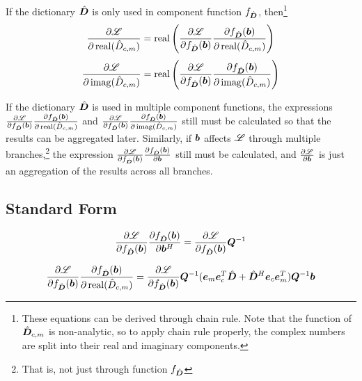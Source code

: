 \begin{appendices}
If the dictionary $\hat{\bm{D}}$ is only used in component function $f_{\hat{\bm{D}}}$, then\footnote{These equations can be derived through chain rule. Note that the function of $\hat{\bm{D}}_{c,m}$ is non-analytic, so to apply chain rule properly, the complex numbers are split into their real and imaginary components.}
\begin{equation}
\frac{\partial \mathscr{L}}{\partial \operatorname{real}(\hat{D}_{c,m})} = \operatorname{real}\left(\frac{\partial \mathscr{L}}{\partial f_{\hat{\bm{D}}}(\bm{b})}\frac{\partial f_{\hat{\bm{D}}}(\bm{b})}{\partial \operatorname{real}(\hat{D}_{c,m})}\right)
\end{equation}
\begin{equation}
\frac{\partial \mathscr{L}}{\partial \operatorname{imag}(\hat{D}_{c,m})} = \operatorname{real}\left(\frac{\partial \mathscr{L}}{\partial f_{\hat{\bm{D}}}(\bm{b})}\frac{\partial f_{\hat{\bm{D}}}(\bm{b})}{\partial \operatorname{imag}(\hat{D}_{c,m})}\right)
\end{equation}

If the dictionary $\hat{\bm{D}}$ is used in multiple component functions, the expressions $\frac{\partial \mathscr{L}}{\partial f_{\hat{\bm{D}}}(\bm{b})}\frac{\partial f_{\hat{\bm{D}}}(\bm{b})}{\partial \operatorname{real}(\hat{D}_{c,m})}$ and $\frac{\partial \mathscr{L}}{\partial f_{\hat{\bm{D}}}(\bm{b})}\frac{\partial f_{\hat{\bm{D}}}(\bm{b})}{\partial \operatorname{imag}(\hat{D}_{c,m})}$ still must be calculated so that the results can be aggregated later. Similarly, if $\bm{b}$ affects $\mathscr{L}$ through multiple branches,\footnote{That is, not just through function $f_{\hat{\bm{D}}}$} the expression $\frac{\partial \mathscr{L}}{\partial f_{\hat{\bm{D}}}(\bm{b})}\frac{\partial f_{\hat{\bm{D}}}(\bm{b})}{\partial \bm{b}}$ still must be calculated, and $\frac{\partial \mathscr{L}}{\partial \bm{b}}$ is just an aggregation of the results across all branches.

\subsection{Standard Form}
\begin{equation}
\frac{\partial \mathscr{L}}{\partial f_{\hat{\bm{D}}}(\bm{b})}\frac{\partial f_{\hat{\bm{D}}}(\bm{b})}{\partial \bm{b}^H} = \frac{\partial \mathscr{L}}{\partial f_{\hat{\bm{D}}}(\bm{b})}\bm{Q}^{-1}
\end{equation}

\begin{equation}
\frac{\partial \mathscr{L}}{\partial f_{\hat{\bm{D}}}(\bm{b})}\frac{\partial f_{\hat{\bm{D}}}(\bm{b})}{\partial \operatorname{real}(\hat{D}_{c,m})} = \frac{\partial \mathscr{L}}{\partial f_{\hat{\bm{D}}}(\bm{b})}\bm{Q}^{-1}(\bm{e}_m\bm{e}_c^T\hat{\bm{D}} + \hat{\bm{D}}^H\bm{e}_c\bm{e}_m^T)\bm{Q}^{-1}\bm{b}
\end{equation}


\end{appendices}
